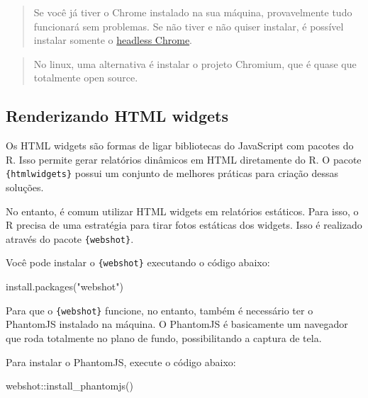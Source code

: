\documentclass[
]{book}
\newenvironment{Shaded}{\begin{snugshade}}{\end{snugshade}}
\newcommand{\FunctionTok}[1]{\textcolor[rgb]{0.00,0.00,0.00}{#1}}
\newcommand{\NormalTok}[1]{#1}
\newcommand{\SpecialCharTok}[1]{\textcolor[rgb]{0.00,0.00,0.00}{#1}}
\newcommand{\StringTok}[1]{\textcolor[rgb]{0.31,0.60,0.02}{#1}}
\begin{document}
\begin{quote}
Se você já tiver o Chrome instalado na sua máquina, provavelmente tudo funcionará sem problemas. Se não tiver e não quiser instalar, é possível instalar somente o \href{https://developers.google.com/web/updates/2017/04/headless-chrome}{headless Chrome}.
\end{quote}

\begin{quote}
No linux, uma alternativa é instalar o projeto Chromium, que é quase que totalmente open source.
\end{quote}

\hypertarget{renderizando-html-widgets}{%
\subsection{Renderizando HTML widgets}\label{renderizando-html-widgets}}

Os HTML widgets são formas de ligar bibliotecas do JavaScript com pacotes do R. Isso permite gerar relatórios dinâmicos em HTML diretamente do R. O pacote \texttt{\{htmlwidgets\}} possui um conjunto de melhores práticas para criação dessas soluções.

No entanto, é comum utilizar HTML widgets em relatórios estáticos. Para isso, o R precisa de uma estratégia para tirar fotos estáticas dos widgets. Isso é realizado através do pacote \texttt{\{webshot\}}.

Você pode instalar o \texttt{\{webshot\}} executando o código abaixo:

\begin{Shaded}
\begin{Highlighting}[]
\FunctionTok{install.packages}\NormalTok{(}\StringTok{"webshot"}\NormalTok{)}
\end{Highlighting}
\end{Shaded}

Para que o \texttt{\{webshot\}} funcione, no entanto, também é necessário ter o PhantomJS instalado na máquina. O PhantomJS é basicamente um navegador que roda totalmente no plano de fundo, possibilitando a captura de tela.

Para instalar o PhantomJS, execute o código abaixo:

\begin{Shaded}
\begin{Highlighting}[]
\NormalTok{webshot}\SpecialCharTok{::}\FunctionTok{install\_phantomjs}\NormalTok{()}
\end{Highlighting}
\end{Shaded}
\end{document}
